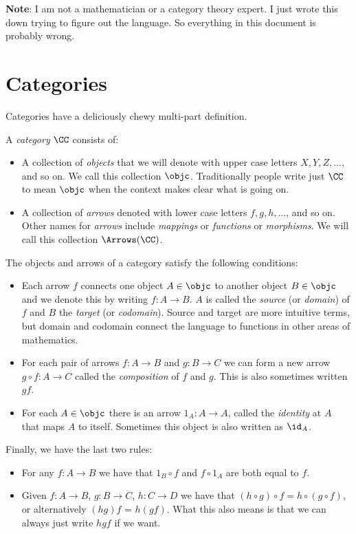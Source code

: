 \pg
{\bf Note}: I am not a mathematician or a category theory expert. I just wrote this down
trying to figure out the language. So everything in this document is probably wrong.

\goodbreak
\section{Categories}

Categories have a deliciously chewy multi-part definition.

\begin{defn}
\label{category}
A {\it category} $\CC$ consists of:
%
\begin{itemize}
\item 
A collection of {\it objects} that we will denote with upper case letters $X, Y, Z, ...$,
and so on.  
We call this collection $\objc$. Traditionally people write just $\CC$ to mean $\objc$
when the context makes clear what is going on.
\item
A collection of {\it arrows} denoted with lower case letters $f, g, h, ...$, and so on.
Other names for {\it arrows} include {\it mappings} or {\it functions} or {\it morphisms}.
We will call this collection $\Arrows(\CC)$. \end{itemize}%
The objects and arrows of a category satisfy the following conditions:
\begin{itemize}
\item
Each arrow $f$ connects one object $A \in \objc$ to another object $B \in \objc$ and we denote
this by writing $f: A \to B$. $A$ is called the {\it source} (or {\it domain}) of $f$ and $B$ the {\it target} (or 
{\it codomain}). Source and target are more intuitive terms, but domain and codomain connect the language
to functions in other areas of mathematics.
\item
For each pair of arrows $f:A \to B$ and $g : B \to C$ we can form a new arrow $g \circ f:
A \to C$ called the {\it composition} of $f$ and $g$. This is also sometimes written $gf$.
\item
For each $A \in \objc$ there is an arrow $1_A: A \to A$, called the {\it identity} at
$A$ that maps $A$ to itself. Sometimes this object is also written as $\id_A$.
\end{itemize}
\goodbreak\noindent Finally, we have the last two rules:

\begin{itemize}
\item For any $f: A \to B$ we have that $1_B \circ f$ and $f \circ 1_A$ are both equal to
$f$. 
\item Given $f: A \to B$, $g: B \to C$, $h: C\to D$ we have that $(h \circ g) \circ f = h
\circ (g \circ f)$, or alternatively $(hg)f$ = $h(gf)$. What this also means is that we
can always just write $hgf$ if we want. \end{itemize}%
\end{defn}%
